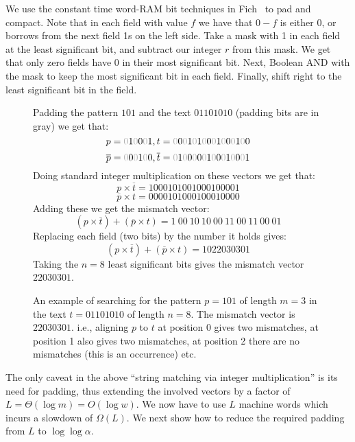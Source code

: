 \documentclass[12pt]{article}
\newcommand{\comment}[1]{}
\newcommand{\W}{{\omega}}
\begin{document}
We use the constant time word-RAM bit techniques in Fich~\cite{faith}
to pad and compact.  Note that in each field with value $f$ we have
that $0-f$ is either 0, or borrows from the next field 1s on the left
side.  Take a mask with 1 in each field at the least significant bit,
and subtract our integer $r$ from this mask.  We get that only zero
fields have 0 in their most significant bit.  Next, Boolean AND with the
mask to keep the most significant bit in each field. Finally,  shift right
to the least significant bit in the field. 



\begin{figure}[htb]
  Padding the pattern $101$ and the text $01101010$ (padding bits are in gray) we get that:
  $$p=\textcolor{Gray}{0} 1\textcolor{Gray}{0}0\textcolor{Gray}{0}1, t=\textcolor{Gray}{0}0\textcolor{Gray}{0}1\textcolor{Gray}{0}1\textcolor{Gray}{0}0\textcolor{Gray}{0}1\textcolor{Gray}{0}0\textcolor{Gray}{0}1\textcolor{Gray}{0}0$$
  $$\overline p=\textcolor{Gray}{0} 0\textcolor{Gray}{0}1\textcolor{Gray}{0}0, \overline t=\textcolor{Gray}{0}1\textcolor{Gray}{0}0\textcolor{Gray}{0}0\textcolor{Gray}{0}1\textcolor{Gray}{0}0\textcolor{Gray}{0}1\textcolor{Gray}{0}0\textcolor{Gray}{0}1$$
 Doing standard integer multiplication on these vectors we get that:
 $$p \times \overline t = 1000101001000100001$$
 $$\overline p \times t = 0000101000100010000$$
 Adding these we get the mismatch vector:\\
  $$(p \times \overline t) + (\overline p \times t) =  1\ 00\ 10\ 10\ 00\ 11\ 00\ 11\ 00\ 01$$
 Replacing each field (two bits) by the number it holds gives:
   $$(p \times \overline t) + (\overline p \times t) =  1 0 2 2 0 3 0 3 0 1$$
   Taking the $n=8$ least significant bits gives the mismatch vector
   $2 2 0 3 0 3 0 1$.

  \caption{\label{fig:convint} An example of searching for the pattern $p=101$ of length $m=3$ in the text $t=01101010$ of length $n=8$. The mismatch vector is $2 2 0 3 0 3 0 1$. i.e., aligning $p$ to $t$ at position 0 gives two mismatches, at position 1 also gives two mismatches, at position 2 there are no mismatches (this is an occurrence) etc.}
\end{figure}


 The only caveat in the
above ``string matching via integer multiplication'' is its need for
padding, thus extending the involved vectors by a factor of $L =
\Theta(\log m) = O(\log w)$. We
now have to use $L$ machine words which incurs a slowdown of $\Omega(L)$.
We next show how to reduce the required padding from $L$ to $\log\log
\alpha$.%
\comment{ We next show that it suffices to use only $O(\log L)$ words
  and change the slowdown to $O(\log L)=O(\log \log \W)$. This
  requires the use of deterministic sampling.}
  
\end{document}
